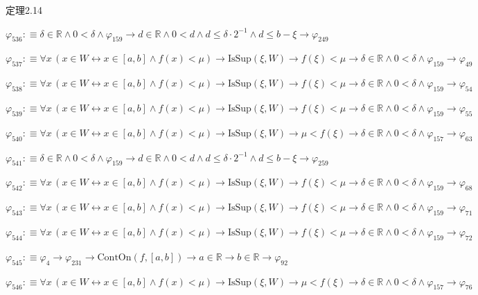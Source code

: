 \begin{fullproof}{定理2.14}
\begin{abbrevlist}
\item $\varphi_{536} :\equiv \delta \in \mathbb{R} \land 0 < \delta \land \varphi_{159} \to d \in \mathbb{R} \land 0 < d \land d \leq \delta \cdot 2^{-1} \land d \leq b - \xi \to \varphi_{249}$
\item $\varphi_{537} :\equiv \forall x\,(x \in W \leftrightarrow x \in [a,b] \land f(x) < \mu) \to \mathrm{IsSup}(\xi,W) \to f(\xi) < \mu \to \delta \in \mathbb{R} \land 0 < \delta \land \varphi_{159} \to \varphi_{49}$
\item $\varphi_{538} :\equiv \forall x\,(x \in W \leftrightarrow x \in [a,b] \land f(x) < \mu) \to \mathrm{IsSup}(\xi,W) \to f(\xi) < \mu \to \delta \in \mathbb{R} \land 0 < \delta \land \varphi_{159} \to \varphi_{54}$
\item $\varphi_{539} :\equiv \forall x\,(x \in W \leftrightarrow x \in [a,b] \land f(x) < \mu) \to \mathrm{IsSup}(\xi,W) \to f(\xi) < \mu \to \delta \in \mathbb{R} \land 0 < \delta \land \varphi_{159} \to \varphi_{55}$
\item $\varphi_{540} :\equiv \forall x\,(x \in W \leftrightarrow x \in [a,b] \land f(x) < \mu) \to \mathrm{IsSup}(\xi,W) \to \mu < f(\xi) \to \delta \in \mathbb{R} \land 0 < \delta \land \varphi_{157} \to \varphi_{63}$
\item $\varphi_{541} :\equiv \delta \in \mathbb{R} \land 0 < \delta \land \varphi_{159} \to d \in \mathbb{R} \land 0 < d \land d \leq \delta \cdot 2^{-1} \land d \leq b - \xi \to \varphi_{259}$
\item $\varphi_{542} :\equiv \forall x\,(x \in W \leftrightarrow x \in [a,b] \land f(x) < \mu) \to \mathrm{IsSup}(\xi,W) \to f(\xi) < \mu \to \delta \in \mathbb{R} \land 0 < \delta \land \varphi_{159} \to \varphi_{68}$
\item $\varphi_{543} :\equiv \forall x\,(x \in W \leftrightarrow x \in [a,b] \land f(x) < \mu) \to \mathrm{IsSup}(\xi,W) \to f(\xi) < \mu \to \delta \in \mathbb{R} \land 0 < \delta \land \varphi_{159} \to \varphi_{71}$
\item $\varphi_{544} :\equiv \forall x\,(x \in W \leftrightarrow x \in [a,b] \land f(x) < \mu) \to \mathrm{IsSup}(\xi,W) \to f(\xi) < \mu \to \delta \in \mathbb{R} \land 0 < \delta \land \varphi_{159} \to \varphi_{72}$
\item $\varphi_{545} :\equiv \varphi_{4} \to \varphi_{231} \to \mathrm{ContOn}(f,[a,b]) \to a \in \mathbb{R} \to b \in \mathbb{R} \to \varphi_{92}$
\item $\varphi_{546} :\equiv \forall x\,(x \in W \leftrightarrow x \in [a,b] \land f(x) < \mu) \to \mathrm{IsSup}(\xi,W) \to \mu < f(\xi) \to \delta \in \mathbb{R} \land 0 < \delta \land \varphi_{157} \to \varphi_{76}$

\end{abbrevlist}
\end{fullproof}
